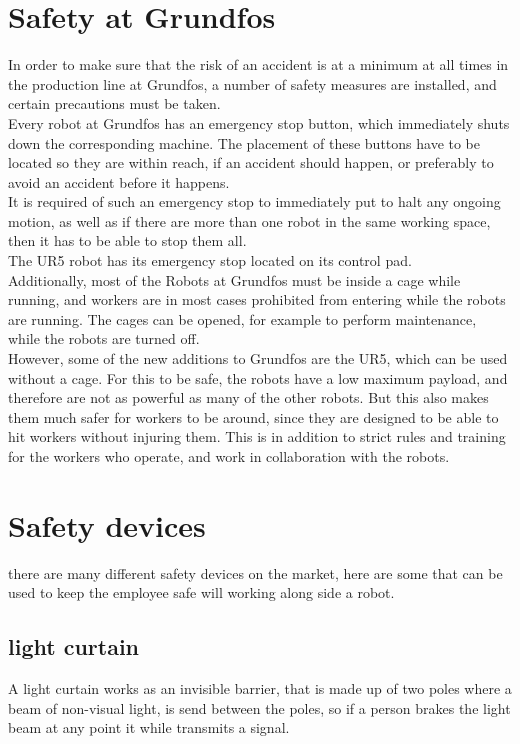 \section{Safety at Grundfos}\label{ch:Safety at Grundfos}
In order to make sure that the risk of an accident is at a minimum at all times in the production line at Grundfos, a number of safety measures are installed, and certain precautions must be taken.\\

Every robot at Grundfos has an emergency stop button, which immediately shuts down the corresponding machine. The placement of these buttons have to be located so they are within reach, if an accident should happen, or preferably to avoid an accident before it happens. \\
It is required of such an emergency stop to immediately put to halt any ongoing motion, as well as if there are more than one robot in the same working space, then it has to be able to stop them all.\\
The UR5 robot has its emergency stop located on its control pad.\\

Additionally, most of the Robots at Grundfos must be inside a cage while running, and workers are in most cases prohibited from entering while the robots are running. The cages can be opened, for example to perform maintenance, while the robots are turned off.\\

However, some of the new additions to Grundfos are the UR5, which can be used without a cage. For this to be safe, the robots have a low maximum payload, and therefore are not as powerful as many of the other robots. But this also makes them much safer for workers to be around, since they are designed to be able to hit workers without injuring them. This is in addition to strict rules and training for the workers who operate, and work in collaboration with the robots. \\

\section{Safety devices}
there are many different safety devices  on the market, here are some that can be used to keep the employee safe will working along side a robot.\\

\subsection{light curtain}
A light curtain works as an invisible barrier, that is made up of two poles where a beam of non-visual light, is send between the poles, so if a person brakes the light beam at any point it while transmits a signal\cite{ligthcurtain}.\\

